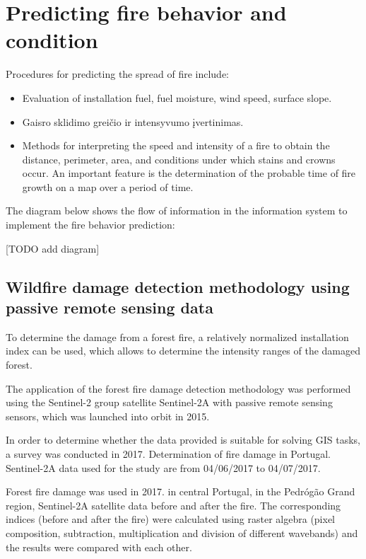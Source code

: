 \chapter{Predicting fire behavior and condition}
	\label{cha:methodology}
	
	Procedures for predicting the spread of fire include:
	
	\begin{itemize}
		\item Evaluation of installation fuel, fuel moisture, wind speed, surface slope.
		\item Gaisro sklidimo greičio ir intensyvumo įvertinimas.
		\item Methods for interpreting the speed and intensity of a fire to obtain the distance, perimeter, area, and conditions under which stains and crowns occur. An important feature is the determination of the probable time of fire growth on a map over a period of time.
	\end{itemize}

	The diagram below shows the flow of information in the information system to implement the fire behavior prediction:
	
	[TODO add diagram]
	
\section{Wildfire damage detection methodology using passive remote sensing data}

	To determine the damage from a forest fire, a relatively normalized installation index can be used, which allows to determine the intensity ranges of the damaged forest.
	
	The application of the forest fire damage detection methodology was performed using the Sentinel-2 group satellite Sentinel-2A with passive remote sensing sensors, which was launched into orbit in 2015.
	
	In order to determine whether the data provided is suitable for solving GIS tasks, a survey was conducted in 2017. Determination of fire damage in Portugal. Sentinel-2A data used for the study are from 04/06/2017 to 04/07/2017.
	
	Forest fire damage was used in 2017. in central Portugal, in the Pedrógão Grand region, Sentinel-2A satellite data before and after the fire. The corresponding indices (before and after the fire) were calculated using raster algebra (pixel composition, subtraction, multiplication and division of different wavebands) and the results were compared with each other.
	
